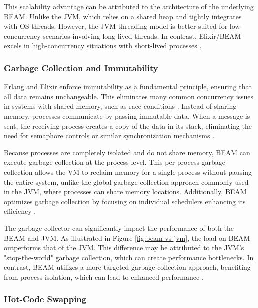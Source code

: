 This scalability advantage can be attributed to the architecture of the underlying \gls{BEAM}. Unlike the \gls{JVM}, which relies on a shared heap and tightly integrates with \gls{OS} threads. However, the \gls{JVM} threading model is better suited for low-concurrency scenarios involving long-lived threads. In contrast, Elixir/\gls{BEAM} excels in high-concurrency situations with short-lived processes \cite{erlang-concurrency-blog, Valkov2018}.

\subsubsection{Garbage Collection and Immutability}

Erlang and Elixir enforce immutability as a fundamental principle, ensuring that all data remains unchangeable. This eliminates many common concurrency issues in systems with shared memory, such as race conditions \cite{Valkov2018}. Instead of sharing memory, processes communicate by passing immutable data. When a message is sent, the receiving process creates a copy of the data in its stack, eliminating the need for semaphore controls or similar synchronization mechanisms \cite{Juric2024,erlang-concurrency-blog}.

Because processes are completely isolated and do not share memory, \gls{BEAM} can execute garbage collection at the process level. This per-process garbage collection allows the \gls{VM} to reclaim memory for a single process without pausing the entire system, unlike the global garbage collection approach commonly used in the \gls{JVM}, where processes can share memory locations. Additionally, \gls{BEAM} optimizes garbage collection by focusing on individual schedulers enhancing its efficiency \cite{Armstrong2013,Juric2024}.

The garbage collector can significantly impact the performance of both the \gls{BEAM} and \gls{JVM}. As illustrated in Figure \ref{fig:beam-vs-jvm}, the load on \gls{BEAM} outperforms that of the \gls{JVM}. This difference may be attributed to the \gls{JVM}'s "stop-the-world" garbage collection, which can create performance bottlenecks. In contrast, \gls{BEAM} utilizes a more targeted garbage collection approach, benefiting from process isolation, which can lead to enhanced performance \cite{Valkov2018, Juric2024}.

\subsubsection{Hot-Code Swapping}

